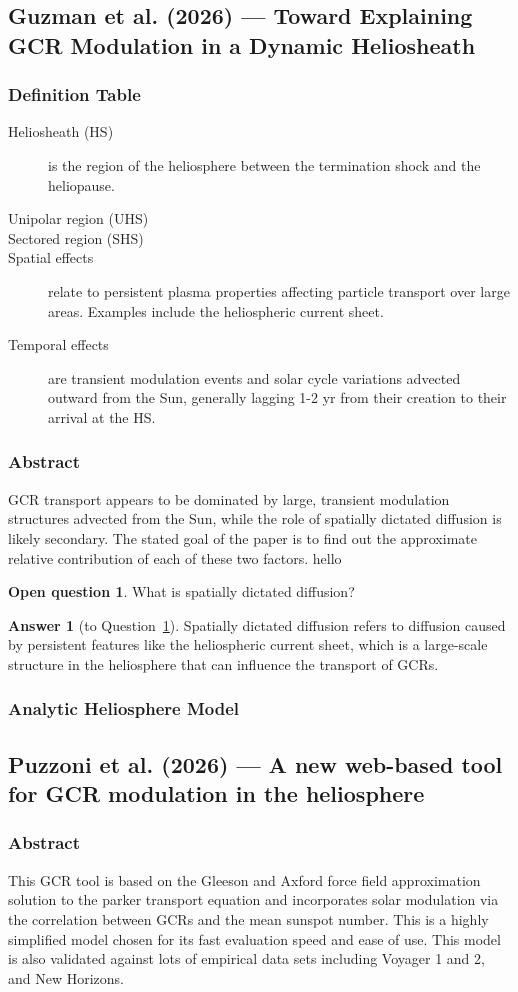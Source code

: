 \documentclass[11pt]{article}
\newcommand{\paper}[1]{\clearpage\subsection{#1}}
\newcommand{\subsubentry}[1]{\subsubsection{#1}}
\theoremstyle{definition}
\newtheorem{question}{Open question}
\newtheorem*{answer}{Answer}
\begin{document}
\paper{Guzman et al. (2026) --- Toward Explaining GCR Modulation in a Dynamic Heliosheath}

\subsubentry{Definition Table}
\begin{description}
  \item[Heliosheath (HS)] is the region of the heliosphere between the termination shock and the heliopause.
  \item[Unipolar region (UHS)] 
  \item[Sectored region (SHS)] 
  \item[Spatial effects] relate to persistent plasma properties affecting particle transport over large areas. Examples 
  include the heliospheric current sheet.
  \item[Temporal effects] are transient modulation events and solar cycle variations advected outward
    from the Sun, generally lagging 1-2 yr from their creation to their arrival
    at the HS.
\end{description}

\subsubentry{Abstract}
GCR transport appears to be dominated by large, transient modulation structures
advected from the Sun, while the role of spatially dictated diffusion is likely secondary.
The stated goal of the paper is to find out the approximate relative contribution of each of these two 
factors. hello
\begin{question}\label{q:spatial}
What is spatially dictated diffusion?
\end{question}

\begin{answer}[to Question~\ref{q:spatial}]
Spatially dictated diffusion refers to diffusion caused by persistent features like the 
heliospheric current sheet, which is a large-scale structure in the heliosphere 
that can influence the transport of GCRs. 
\end{answer}

\subsubentry{Analytic Heliosphere Model}


\paper{Puzzoni et al. (2026) --- A new web-based tool for GCR modulation in the heliosphere}
\subsubentry{Abstract}
This GCR tool is based on the Gleeson and Axford force field approximation solution to the parker transport equation and 
incorporates solar modulation via the correlation between GCRs and the mean sunspot number. 
This is a highly simplified model chosen for its fast evaluation speed and ease of use.
This model is also validated against lots of empirical data sets including Voyager 1 and 2, and New Horizons.
\end{document}
